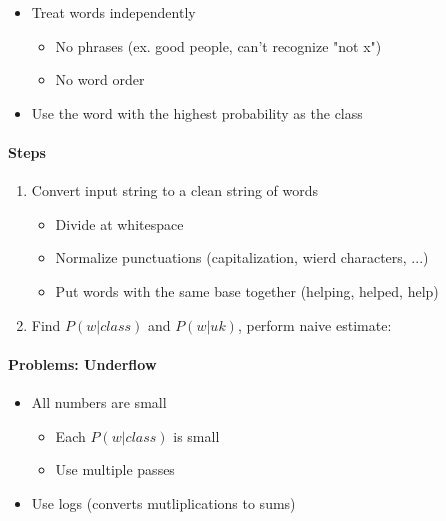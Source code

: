       \begin{itemize}
        \item Treat words independently
        \begin{itemize}
          \item No phrases (ex. good people, can't recognize "not x")
          \item No word order
        \end{itemize}

        \item Use the word with the highest probability as the class
      \end{itemize}

      \paragraph{Steps}
      \begin{enumerate}
        \item Convert input string to a clean string of words
        \begin{itemize}
          \item Divide at whitespace
          \item Normalize punctuations (capitalization, wierd characters, ...)
          \item Put words with the same base together (helping, helped, help)
        \end{itemize}

        \item Find $ P(w | class) $ and $ P (w | uk) $, perform naive estimate:
      \end{enumerate}

      \paragraph{Problems: Underflow}
      \begin{itemize}
        \item All numbers are small
        \begin{itemize}
          \item Each $ P ( w| class) $ is small
          \item Use multiple passes
        \end{itemize}

        \item Use logs (converts mutliplications to sums)
      \end{itemize}

